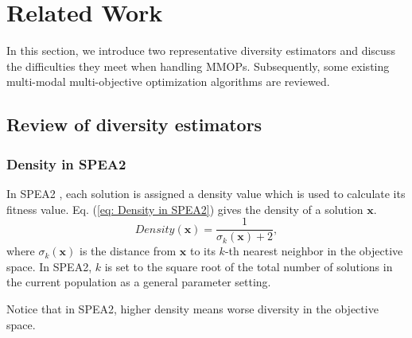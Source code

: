 \section{Related Work}
\label{sec: Related Work}
In this section, we introduce two representative diversity estimators and discuss the difficulties they meet when handling MMOPs. Subsequently, some existing multi-modal multi-objective optimization algorithms are reviewed.
\subsection{Review of diversity estimators}
\subsubsection{Density in SPEA2}
In SPEA2 \cite{SPEA2}, each solution is assigned a density value which is used to calculate its fitness value. Eq. (\ref{eq: Density in SPEA2}) gives the density of a solution $\boldsymbol{x}$.
\begin{equation}
	\textit{Density} (\boldsymbol{x}) = \frac{1}{\sigma_k(\boldsymbol{x}) + 2},
	\label{eq: Density in SPEA2}
\end{equation}
where $\sigma_k(\boldsymbol{x})$ is the distance from $\boldsymbol{x}$ to its $k$-th nearest neighbor in the objective space. In SPEA2, $k$ is set to the square root of the total number of solutions in the current population as a general parameter setting.

Notice that in SPEA2, higher density means worse diversity in the objective space.

